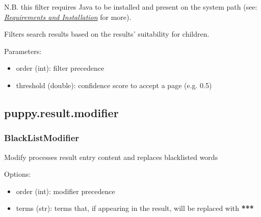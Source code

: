 \documentclass[letterpaper,10pt,english]{sphinxmanual}
\begin{document}
N.B. this filter requires Java to be installed and present on the system path (see: {\hyperref[installation:requirements-and-installation]{\emph{Requirements and Installation}}} for more).

\begin{fulllineitems}
\label{api3.0:puppy.result.filter.SuitabilityFilter}
Filters search results based on the results' suitability for children.

Parameters:
\begin{itemize}
\item {} 
order (int): filter precedence

\item {} 
threshold (double): confidence score to accept a page (e.g. 0.5)

\end{itemize}

\end{fulllineitems}



\subsection{puppy.result.modifier}
\label{api3.0:puppy-result-modifier}\label{api3.0:module-puppy.result.modifier}

\subsubsection{BlackListModifier}
\label{api3.0:blacklistmodifier}

\begin{fulllineitems}
\label{api3.0:puppy.result.modifier.BlackListResultModifier}
Modify processes result entry content and replaces blacklisted words

Options:
\begin{itemize}
\item {} 
order (int): modifier precedence

\item {} 
terms (str): terms that, if appearing in the result, will be replaced with {\color{red}\bfseries{}**}{\color{red}\bfseries{}*}

\end{itemize}

\end{fulllineitems}
\end{document}
